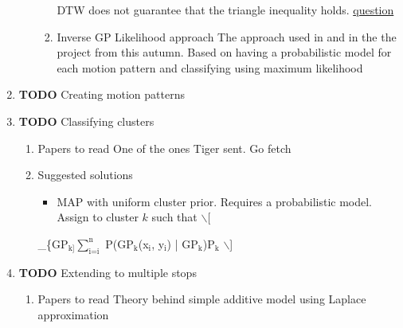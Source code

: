 \documentclass[11pt]{article}
\begin{document}
\begin{enumerate}
\begin{enumerate}
\begin{enumerate}
DTW does not guarantee that the triangle inequality holds. \hyperref[tiger-question-3]{question}

\item Inverse GP Likelihood approach
\label{sec:org9755729}
The approach used in \cite{Kim2011Nov} and in the the project
from this autumn. Based on having a probabilistic model for
each motion pattern and classifying using maximum likelihood
\end{enumerate}
\end{enumerate}
\item {\bfseries\sffamily TODO} Creating motion patterns
\label{sec:orge1b49c5}
\item {\bfseries\sffamily TODO} Classifying clusters
\label{sec:orgcd24da4}
\begin{enumerate}
\item Papers to read
\label{sec:org9ebd8c6}
One of the ones Tiger sent. Go fetch

\item Suggested solutions
\label{sec:org8d45d2f}
\begin{itemize}
\item MAP with uniform cluster prior. Requires a probabilistic
model. Assign to cluster \(k\) such that $\backslash$[
\end{itemize}
\argmax\_\{GP\(_{\text{k]}}\)\(\sum_{\text{i=i}}^{\text{n}}\) P(GP\(_{\text{k}}\)(x\(_{\text{i}}\), y\(_{\text{i}}\)) | GP\(_{\text{k}}\))P\(_{\text{k}}\)
$\backslash$]
\end{enumerate}

\item {\bfseries\sffamily TODO} Extending to multiple stops
\label{sec:org6770255}
\begin{enumerate}
\item Papers to read
\label{sec:org6aa9936}
Theory behind simple additive model using Laplace approximation \cite{Bishop2006Aug}


\end{enumerate}
\end{enumerate}
\end{document}
